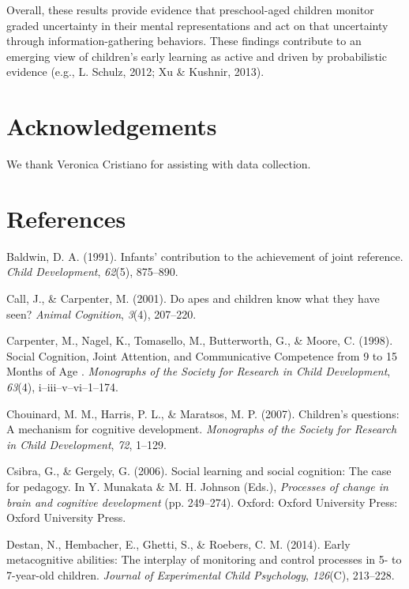 \documentclass[10pt, letterpaper]{article}
\begin{document}
Overall, these results provide evidence that preschool-aged children
monitor graded uncertainty in their mental representations and act on
that uncertainty through information-gathering behaviors. These findings
contribute to an emerging view of children's early learning as active
and driven by probabilistic evidence (e.g., L. Schulz, 2012; Xu \&
Kushnir, 2013).

\section{Acknowledgements}\label{acknowledgements}

We thank Veronica Cristiano for assisting with data collection.

\section{References}\label{references}

\setlength{\parindent}{-0.1in} \setlength{\leftskip}{0.125in} \noindent

\hypertarget{refs}{}
\hypertarget{ref-Baldwin1991}{}
Baldwin, D. A. (1991). Infants' contribution to the achievement of joint
reference. \emph{Child Development}, \emph{62}(5), 875--890.

\hypertarget{ref-Call2001}{}
Call, J., \& Carpenter, M. (2001). Do apes and children know what they
have seen? \emph{Animal Cognition}, \emph{3}(4), 207--220.

\hypertarget{ref-Carpenter1998}{}
Carpenter, M., Nagel, K., Tomasello, M., Butterworth, G., \& Moore, C.
(1998). Social Cognition, Joint Attention, and Communicative Competence
from 9 to 15 Months of Age . \emph{Monographs of the Society for
Research in Child Development}, \emph{63}(4), i--iii--v--vi--1--174.

\hypertarget{ref-Chouinard2007}{}
Chouinard, M. M., Harris, P. L., \& Maratsos, M. P. (2007). Children's
questions: A mechanism for cognitive development. \emph{Monographs of
the Society for Research in Child Development}, \emph{72}, 1--129.

\hypertarget{ref-Csibra2006}{}
Csibra, G., \& Gergely, G. (2006). Social learning and social cognition:
The case for pedagogy. In Y. Munakata \& M. H. Johnson (Eds.),
\emph{Processes of change in brain and cognitive development} (pp.
249--274). Oxford: Oxford University Press: Oxford University Press.

\hypertarget{ref-Destan2014}{}
Destan, N., Hembacher, E., Ghetti, S., \& Roebers, C. M. (2014). Early
metacognitive abilities: The interplay of monitoring and control
processes in 5- to 7-year-old children. \emph{Journal of Experimental
Child Psychology}, \emph{126}(C), 213--228.
\end{document}

